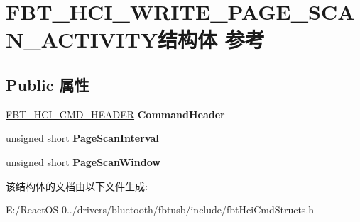 \hypertarget{struct_f_b_t___h_c_i___w_r_i_t_e___p_a_g_e___s_c_a_n___a_c_t_i_v_i_t_y}{}\section{F\+B\+T\+\_\+\+H\+C\+I\+\_\+\+W\+R\+I\+T\+E\+\_\+\+P\+A\+G\+E\+\_\+\+S\+C\+A\+N\+\_\+\+A\+C\+T\+I\+V\+I\+T\+Y结构体 参考}
\label{struct_f_b_t___h_c_i___w_r_i_t_e___p_a_g_e___s_c_a_n___a_c_t_i_v_i_t_y}
\subsection*{Public 属性}
\begin{DoxyCompactItemize}
\item 
\mbox{\label{struct_f_b_t___h_c_i___w_r_i_t_e___p_a_g_e___s_c_a_n___a_c_t_i_v_i_t_y_a039093b5ff6ca68b6f88321096cb53e1}} 
\hyperlink{struct_f_b_t___h_c_i___c_m_d___h_e_a_d_e_r}{F\+B\+T\+\_\+\+H\+C\+I\+\_\+\+C\+M\+D\+\_\+\+H\+E\+A\+D\+ER} {\bfseries Command\+Header}
\item 
\mbox{\label{struct_f_b_t___h_c_i___w_r_i_t_e___p_a_g_e___s_c_a_n___a_c_t_i_v_i_t_y_acca1b8105fb2ec7499b04b797d0f6627}} 
unsigned short {\bfseries Page\+Scan\+Interval}
\item 
\mbox{\label{struct_f_b_t___h_c_i___w_r_i_t_e___p_a_g_e___s_c_a_n___a_c_t_i_v_i_t_y_af5a96347128f0a9b358080ade44f97f0}} 
unsigned short {\bfseries Page\+Scan\+Window}
\end{DoxyCompactItemize}


该结构体的文档由以下文件生成\+:\begin{DoxyCompactItemize}
\item 
E\+:/\+React\+O\+S-\/0../drivers/bluetooth/fbtusb/include/fbt\+Hci\+Cmd\+Structs.\+h\end{DoxyCompactItemize}
